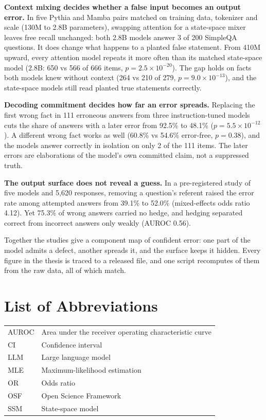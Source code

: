 \documentclass[11pt,a4paper,oneside]{report}
\newcommand{\sci}[2]{#1\times10^{#2}}
\begin{document}
\textbf{Context mixing decides whether a false input becomes an output error.} In five Pythia and Mamba pairs matched on training data, tokenizer and scale (130M to 2.8B parameters), swapping attention for a state-space mixer leaves free recall unchanged: both 2.8B models answer 3 of 200 SimpleQA questions. It does change what happens to a planted false statement. From 410M upward, every attention model repeats it more often than its matched state-space model (2.8B: 650 vs 566 of 666 items, $p=\sci{2.5}{-20}$). The gap holds on facts both models knew without context (264 vs 210 of 279, $p=\sci{9.0}{-13}$), and the state-space models still read planted true statements correctly.

\textbf{Decoding commitment decides how far an error spreads.} Replacing the first wrong fact in 111 erroneous answers from three instruction-tuned models cuts the share of answers with a later error from 92.5\% to 48.1\% ($p=\sci{5.5}{-12}$). A different wrong fact works as well (60.8\% vs 54.6\% error-free, $p=0.38$), and the models answer correctly in isolation on only 2 of the 111 items. The later errors are elaborations of the model's own committed claim, not a suppressed truth.

\textbf{The output surface does not reveal a guess.} In a pre-registered study of five models and 5,620 responses, removing a question's referent raised the error rate among attempted answers from 39.1\% to 52.0\% (mixed-effects odds ratio 4.12). Yet 75.3\% of wrong answers carried no hedge, and hedging separated correct from incorrect answers only weakly (AUROC 0.56).

Together the studies give a component map of confident error: one part of the model admits a defect, another spreads it, and the surface keeps it hidden. Every figure in the thesis is traced to a released file, and one script recomputes \ledgertotal{} of them from the raw data, all of which match.

\vspace{6pt}

\tableofcontents
\listoffigures
\listoftables

\chapter*{List of Abbreviations}
\begin{tabularx}{\linewidth}{@{}lX@{}}
AUROC & Area under the receiver operating characteristic curve\\
CI & Confidence interval\\
LLM & Large language model\\
MLE & Maximum-likelihood estimation\\
OR & Odds ratio\\
OSF & Open Science Framework\\
SSM & State-space model\\
\end{tabularx}
\end{document}
